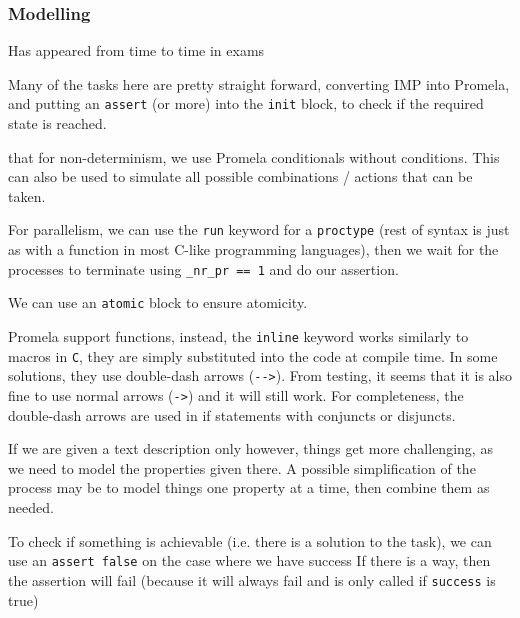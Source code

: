 \subsubsection{Modelling}
\begin{examdetails}
    Has appeared from time to time in exams
\end{examdetails}
Many of the tasks here are pretty straight forward, converting IMP into Promela,
and putting an \texttt{assert} (or more) into the \texttt{init} block, to check if the required state is reached.

 that for non-determinism, we use Promela conditionals without conditions.
This can also be used to simulate all possible combinations / actions that can be taken.

For parallelism, we can use the \texttt{run} keyword for a \texttt{proctype} (rest of syntax is just as with a function in most C-like programming languages),
then we wait for the processes to terminate using \texttt{\_nr\_pr == 1} and do our assertion.

We can use an \texttt{atomic} block to ensure atomicity.

Promela  support functions, instead, the \texttt{inline} keyword works similarly to macros in \texttt{C},
they are simply substituted into the code at compile time.
In some solutions, they use double-dash arrows (\verb|-->|). From testing, it seems that it is also fine to use normal arrows (\verb|->|) and it will still work.
For completeness, the double-dash arrows are used in if statements with conjuncts or disjuncts.


If we are given a text description only however, things get more challenging, as we need to model the properties given there.
A possible simplification of the process may be to model things one property at a time, then combine them as needed.

To check if something is achievable (i.e. there is a solution to the task), we can use an \texttt{assert false} on the case where we have success
If there is a way, then the assertion will fail (because it will always fail and is only called if \texttt{success} is true)
